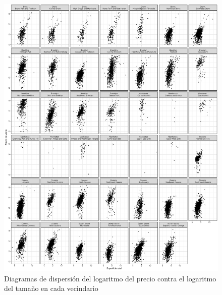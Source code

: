\begin{figure}[H]
    \centering
    \includegraphics[width=1.03\textwidth]{images/eda_scatter_by_neighborhood.pdf}
    \caption{Diagramas de dispersión del logaritmo del precio contra el logaritmo del tamaño en cada vecindario}
    \label{fig:eda_scatter_by_neighborhood}
\end{figure}

